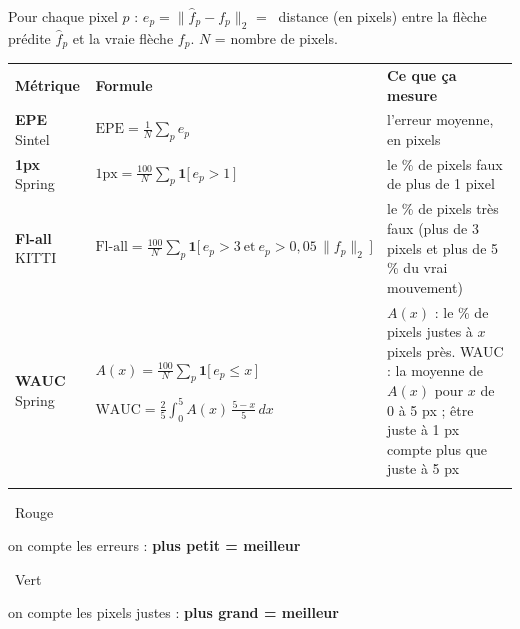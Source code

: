 \documentclass[border=10pt,varwidth=860pt]{standalone}
\newcommand{\ind}{\mathbf{1}}
\begin{document}
\fontsize{14}{17}\selectfont

\noindent Pour chaque pixel $p$ : \quad $e_p = \big\| \hat{f}_p - f_p \big\|_2$ \quad = \ distance (en pixels) entre la flèche prédite $\hat{f}_p$ et la vraie flèche $f_p$. \quad $N$ = nombre de pixels.

\vspace{12pt}
\noindent
\begin{tabular}{|>{\raggedright\arraybackslash}m{88pt}|>{\centering\arraybackslash}m{340pt}|>{\raggedright\arraybackslash}m{300pt}|}
\hhline{|-|-|-|}
\textbf{Métrique} & \textbf{Formule} & \textbf{Ce que ça mesure} \\
\hhline{|-|-|-|}
\rowcolor{rougep}
\textbf{EPE} \newline Sintel &
$\displaystyle \mathrm{EPE} = \frac{1}{N} \sum_{p} e_p$ &
l'erreur moyenne, en pixels \\
\hhline{|-|-|-|}
\rowcolor{rougep}
\textbf{1px} \newline Spring &
$\displaystyle \mathrm{1px} = \frac{100}{N} \sum_{p} \ind\big[\, e_p > 1 \,\big]$ &
le \% de pixels faux de plus de 1 pixel \\
\hhline{|-|-|-|}
\rowcolor{rougep}
\textbf{Fl-all} \newline KITTI &
$\displaystyle \mathrm{Fl\text{-}all} = \frac{100}{N} \sum_{p} \ind\big[\, e_p > 3 \ \text{et} \ e_p > 0{,}05\, \| f_p \|_2 \,\big]$ &
le \% de pixels très faux \newline (plus de 3 pixels et plus de 5\,\% du vrai mouvement) \\
\hhline{|-|-|-|}
\rowcolor{vertp}
\textbf{WAUC} \newline Spring &
$\displaystyle A(x) = \frac{100}{N} \sum_{p} \ind\big[\, e_p \le x \,\big]$
\par\vspace{6pt}
$\displaystyle \mathrm{WAUC} = \frac{2}{5} \int_{0}^{5} A(x)\, \frac{5 - x}{5}\, dx$ &
$A(x)$ : le \% de pixels justes à $x$ pixels près. \newline WAUC : la moyenne de $A(x)$ pour $x$ de 0 à 5 px ; être juste à 1 px compte plus que juste à 5 px \\
\hhline{|-|-|-|}
\end{tabular}

\vspace{10pt}
\noindent\colorbox{rougep}{\strut\ Rouge\ } on compte les erreurs : \textbf{plus petit = meilleur} \qquad
\colorbox{vertp}{\strut\ Vert\ } on compte les pixels justes : \textbf{plus grand = meilleur}
\end{document}
